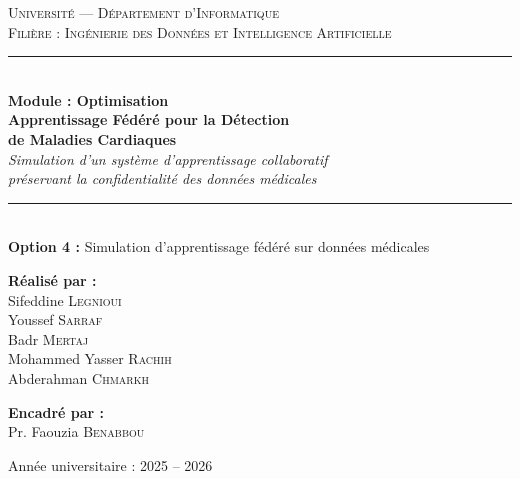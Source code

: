 \documentclass[12pt,a4paper]{report}
\begin{document}
\begin{titlepage}
\centering

{\Large \textsc{Universit\'{e} --- D\'{e}partement d'Informatique}}\\[0.3cm]
{\large \textsc{Fili\`{e}re : Ing\'{e}nierie des Donn\'{e}es et Intelligence Artificielle}}\\[0.3cm]
\rule{\textwidth}{1.5pt}\\[1cm]

{\large \textbf{Module : Optimisation}}\\[0.8cm]

{\LARGE \textbf{Apprentissage F\'{e}d\'{e}r\'{e} pour la D\'{e}tection}}\\[0.3cm]
{\LARGE \textbf{de Maladies Cardiaques}}\\[0.6cm]

{\large \textit{Simulation d'un syst\`{e}me d'apprentissage collaboratif}}\\
{\large \textit{pr\'{e}servant la confidentialit\'{e} des donn\'{e}es m\'{e}dicales}}\\[1cm]

\rule{\textwidth}{1.5pt}\\[1cm]

{\large \textbf{Option 4 :} Simulation d'apprentissage f\'{e}d\'{e}r\'{e} sur donn\'{e}es m\'{e}dicales}\\[1.5cm]

\begin{minipage}[t]{0.45\textwidth}
\raggedright
{\large \textbf{R\'{e}alis\'{e} par :}}\\[0.3cm]
{\large Sifeddine \textsc{Legnioui}}\\
{\large Youssef \textsc{Sarraf}}\\
{\large Badr \textsc{Mertaj}}\\
{\large Mohammed Yasser \textsc{Rachih}}\\
{\large Abderahman \textsc{Chmarkh}}
\end{minipage}
\hfill
\begin{minipage}[t]{0.45\textwidth}
\raggedleft
{\large \textbf{Encadr\'{e} par :}}\\[0.3cm]
{\large Pr. Faouzia \textsc{Benabbou}}
\end{minipage}

\vfill

{\large Ann\'{e}e universitaire : 2025 -- 2026}

\end{titlepage}

\end{document}
